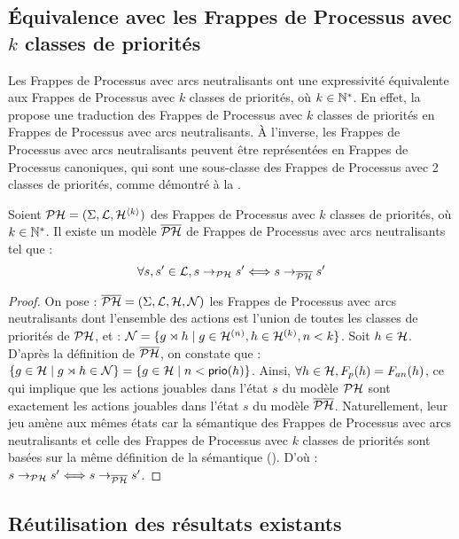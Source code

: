 \subsection{Équivalence avec les Frappes de Processus avec $k$ classes de priorités}

Les Frappes de Processus avec arcs neutralisants ont une expressivité équivalente
aux Frappes de Processus avec $k$ classes de priorités, où $k \in \mathbb{N}^*$.
En effet, la  propose une traduction des Frappes de Processus
avec $k$ classes de priorités en Frappes de Processus avec arcs neutralisants.
À l'inverse, les Frappes de Processus avec arcs neutralisants peuvent être représentées
en Frappes de Processus canoniques, qui sont une sous-classe des Frappes de Processus avec
2 classes de priorités, comme démontré à la .

\begin{theorem}
  Soient $\mathcal{PH} = (\Sigma, \mathcal{L}, \mathcal{H}^{{\langle k \rangle}})$ des Frappes de Processus avec $k$ classes
  de priorités, où $k \in \mathbb{N}^*$.
  Il existe un modèle $\overline{\mathcal{PH}}$ de Frappes de Processus avec arcs neutralisants tel que :
  \[\forall s, s' \in \mathcal{L}, s \rightarrow_{\mathcal{PH}} s' \Longleftrightarrow s \rightarrow_{\overline{\mathcal{PH}}} s' \]
\end{theorem}

\begin{proof}
  On pose : $\overline{\mathcal{PH}} = (\Sigma, \mathcal{L}, \mathcal{H}, \mathcal{N})$ les Frappes de Processus avec arcs neutralisants
  dont l'ensemble des actions est l'union de toutes les classes de priorités de $\mathcal{PH}$, et :
  $\mathcal{N} = \{ g\rtimes h \mid g \in \mathcal{H}^{(n)}, h \in \mathcal{H}^{(k)}, n < k \}$.
  Soit $h \in \mathcal{H}$.
  D'après la définition de $\overline{\mathcal{PH}}$, on constate que :
  $\{ g \in \mathcal{H} \mid g\rtimes h \in \mathcal{N} \} = \{ g \in \mathcal{H} \mid n < \mathsf{prio}(h) \}$.
  Ainsi, $\forall h \in \mathcal{H}, F_{p}(h) = F_{an}(h)$,
  ce qui implique que les actions jouables dans l'état $s$ du modèle $\mathcal{PH}$
  sont exactement les actions jouables dans l'état $s$ du modèle $\overline{\mathcal{PH}}$.
  Naturellement, leur jeu amène aux mêmes états car la sémantique des Frappes de Processus
  avec arcs neutralisants et celle des Frappes de Processus avec $k$ classes de priorités
  sont basées sur la même définition de la sémantique ().
  D'où : $s \rightarrow_{\mathcal{PH}} s' \Longleftrightarrow s \rightarrow_{\overline{\mathcal{PH}}} s'$.
\end{proof}



\subsection{Réutilisation des résultats existants}

